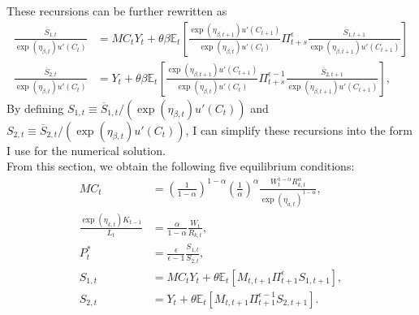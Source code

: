 \documentclass[12 pt, oneside]{article}
\theoremstyle{definition}
\theoremstyle{definition}
\theoremstyle{definition}
\newcommand{\E}{\mathbb{E}}
\begin{document}
These recursions can be further rewritten as
\begin{align*}
  \frac{\overline{S}_{1, t}}{\exp(\eta_{\beta, t})u'(C_t)} & =  MC_t Y_t + \theta \beta \E_t\left[\frac{\exp(\eta_{\beta, t + 1}) u'(C_{t + 1})}{\exp(\eta_{\beta, t}) u'(C_t)}\Pi_{t + s}^\epsilon \frac{\overline{S}_{1, t + 1}}{\exp(\eta_{\beta, t + 1})u'(C_{t + 1})}\right]\\
  \frac{\overline{S}_{2, t}}{\exp(\eta_{\beta, t})u'(C_t)} & =  Y_t + \theta \beta \E_t\left[\frac{\exp(\eta_{\beta, t + 1}) u'(C_{t + 1})}{\exp(\eta_{\beta, t}) u'(C_t)}\Pi_{t + s}^{\epsilon - 1} \frac{\overline{S}_{2, t + 1}}{\exp(\eta_{\beta, t + 1})u'(C_{t + 1})}\right],
\end{align*}
By defining $S_{1, t} \equiv \overline{S}_{1, t}/ (\exp(\eta_{\beta, t})u'(C_t))$ and $S_{2, t} \equiv \overline{S}_{2, t}/ (\exp(\eta_{\beta, t})u'(C_t))$, I can simplify these recursions into the form I use for the numerical solution.\\

From this section, we obtain the following five equilibrium conditions:
\begin{align}
  \label{eq:mc soln}
  MC_t & =  \left(\frac{1}{1 - \alpha}\right)^{1 - \alpha}\left(\frac{1}{\alpha}\right)^{\alpha}\frac{W_t^{1 - \alpha}R_{k, t}^{\alpha}}{ \exp(\eta_{a, t})^{1 - \alpha}},\\
  \label{eq:optimal capital labor ratio}
  \frac{\exp(\eta_{k, t})K_{t - 1}}{L_t} & =\frac{\alpha}{1 - \alpha} \frac{W_t}{R_{k, t}},\\
  \label{eq:real optimal reset price}
  P_t^* & = \frac{\epsilon}{\epsilon - 1}\frac{S_{1, t}}{S_{2, t}},\\
  \label{eq:numerator recursion}
  S_{1, t} & = MC_t Y_t + \theta\E_t[M_{t, t + 1} \Pi_{t + 1}^\epsilon S_{1, t + 1}],\\
  \label{eq:denominator recursion}
  S_{2, t} & =  Y_t + \theta\E_t[M_{t, t + 1} \Pi_{t + 1}^{\epsilon - 1} S_{2, t + 1}].
\end{align}
\end{document}
